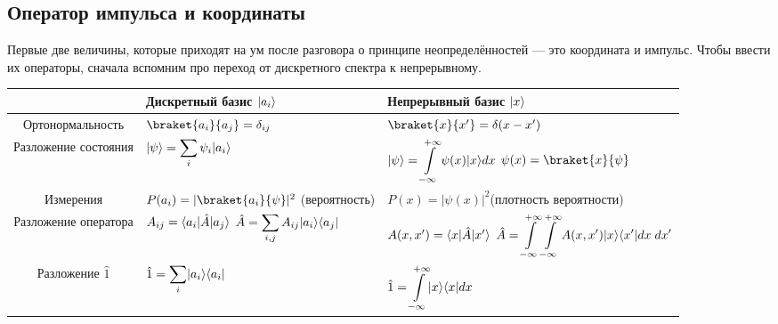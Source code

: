 \subsection{Оператор импульса и координаты}
Первые две величины, которые приходят на ум после разговора о принципе
неопределённостей --- это координата и импульс. Чтобы ввести их операторы,
сначала вспомним про переход от дискретного спектра к непрерывному.
\begin{center}
  \begin{tabular}{ |c|m{12em}|m{15em}| }
    \hline
    & \textbf{Дискретный базис $\lvert a_i\rangle$} & \textbf{Непрерывный базис $\lvert x\rangle$} \\
    \hline
    Ортонормальность & $\braket{a_i}{a_j} = \delta_{ij}$ & $\braket{x}{x'} = \delta (x - x')$ \\
    \hline
    Разложение состояния & \(\displaystyle \lvert\psi\rangle = \sum_i \psi_i \lvert a_i\rangle\) &
    \(\displaystyle \lvert\psi\rangle = \int\limits_{-\infty}^{+\infty} \psi(x) \lvert x\rangle dx\)
    \newline \(\displaystyle \psi(x) = \braket{x}{\psi}\) \\
    \hline
    Измерения & $P(a_i) = |\braket{a_i}{\psi}|^2$ \newline (вероятность) & $P(x) =
      |\psi(x)|^2$\newline (плотность вероятности) \\
    \hline
    Разложение оператора & $A_{ij} = \langle a_i\rvert \hat{A} \lvert a_j\rangle$
    \newline \(\displaystyle \hat{A} = \sum_{i,j} A_{ij} \lvert a_i\rangle \langle a_j\rvert\) & $A(x, x') =
      \langle x\rvert \hat{A} \lvert x'\rangle$ \newline \(\displaystyle \hat{A} =
    \int\limits_{-\infty}^{+\infty} \int\limits_{-\infty}^{+\infty} A(x, x')
    \lvert x\rangle \langle x'\rvert dx \; dx'\) \\
    \hline
    Разложение $\hat{1}$ & \(\displaystyle \hat{1} = \sum_i \lvert a_i\rangle \langle a_i\rvert \) &
    \(\displaystyle \hat{1} = \int\limits_{-\infty}^{+\infty} \lvert x\rangle \langle x\rvert dx\) \\
    \hline
  \end{tabular}
\end{center}

